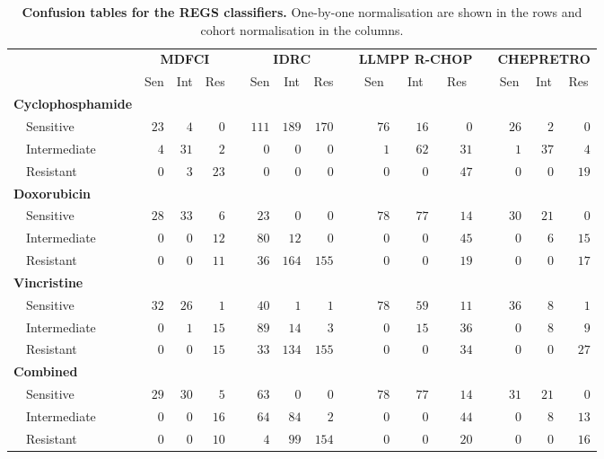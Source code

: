 
\begin{table*}[!tbp]
\small
\caption{\textbf{Confusion tables for the REGS classifiers.} One-by-one normalisation are shown in the rows and cohort normalisation in the columns.\label{tab:confusiondrugonebyone}}
\begin{center}
\begin{tabular}{lrrrcrrrcrrrcrrr}
\hline\hline
\multicolumn{1}{l}{\bfseries  }&\multicolumn{3}{c}{\bfseries MDFCI}&\multicolumn{1}{c}{\bfseries }&\multicolumn{3}{c}{\bfseries IDRC}&\multicolumn{1}{c}{\bfseries }&\multicolumn{3}{c}{\bfseries LLMPP R-CHOP}&\multicolumn{1}{c}{\bfseries }&\multicolumn{3}{c}{\bfseries CHEPRETRO}\tabularnewline
\cline{2-4} \cline{6-8} \cline{10-12} \cline{14-16}
\multicolumn{1}{l}{}&\multicolumn{1}{c}{Sen}&\multicolumn{1}{c}{Int}&\multicolumn{1}{c}{Res}&\multicolumn{1}{c}{}&\multicolumn{1}{c}{Sen}&\multicolumn{1}{c}{Int}&\multicolumn{1}{c}{Res}&\multicolumn{1}{c}{}&\multicolumn{1}{c}{Sen}&\multicolumn{1}{c}{Int}&\multicolumn{1}{c}{Res}&\multicolumn{1}{c}{}&\multicolumn{1}{c}{Sen}&\multicolumn{1}{c}{Int}&\multicolumn{1}{c}{Res}\tabularnewline
\hline
{\bfseries Cyclophosphamide}&&&&&&&&&&&&&&&\tabularnewline
~~Sensitive&$23$&$ 4$&$ 0$&&$111$&$189$&$170$&&$76$&$16$&$ 0$&&$26$&$ 2$&$ 0$\tabularnewline
~~Intermediate&$ 4$&$31$&$ 2$&&$  0$&$  0$&$  0$&&$ 1$&$62$&$31$&&$ 1$&$37$&$ 4$\tabularnewline
~~Resistant&$ 0$&$ 3$&$23$&&$  0$&$  0$&$  0$&&$ 0$&$ 0$&$47$&&$ 0$&$ 0$&$19$\tabularnewline
\hline
{\bfseries Doxorubicin}&&&&&&&&&&&&&&&\tabularnewline
~~Sensitive&$28$&$33$&$ 6$&&$ 23$&$  0$&$  0$&&$78$&$77$&$14$&&$30$&$21$&$ 0$\tabularnewline
~~Intermediate&$ 0$&$ 0$&$12$&&$ 80$&$ 12$&$  0$&&$ 0$&$ 0$&$45$&&$ 0$&$ 6$&$15$\tabularnewline
~~Resistant&$ 0$&$ 0$&$11$&&$ 36$&$164$&$155$&&$ 0$&$ 0$&$19$&&$ 0$&$ 0$&$17$\tabularnewline
\hline
{\bfseries Vincristine}&&&&&&&&&&&&&&&\tabularnewline
~~Sensitive&$32$&$26$&$ 1$&&$ 40$&$  1$&$  1$&&$78$&$59$&$11$&&$36$&$ 8$&$ 1$\tabularnewline
~~Intermediate&$ 0$&$ 1$&$15$&&$ 89$&$ 14$&$  3$&&$ 0$&$15$&$36$&&$ 0$&$ 8$&$ 9$\tabularnewline
~~Resistant&$ 0$&$ 0$&$15$&&$ 33$&$134$&$155$&&$ 0$&$ 0$&$34$&&$ 0$&$ 0$&$27$\tabularnewline
\hline
{\bfseries Combined}&&&&&&&&&&&&&&&\tabularnewline
~~Sensitive&$29$&$30$&$ 5$&&$ 63$&$  0$&$  0$&&$78$&$77$&$14$&&$31$&$21$&$ 0$\tabularnewline
~~Intermediate&$ 0$&$ 0$&$16$&&$ 64$&$ 84$&$  2$&&$ 0$&$ 0$&$44$&&$ 0$&$ 8$&$13$\tabularnewline
~~Resistant&$ 0$&$ 0$&$10$&&$  4$&$ 99$&$154$&&$ 0$&$ 0$&$20$&&$ 0$&$ 0$&$16$\tabularnewline
\hline
\end{tabular}
\end{center}
\end{table*}
